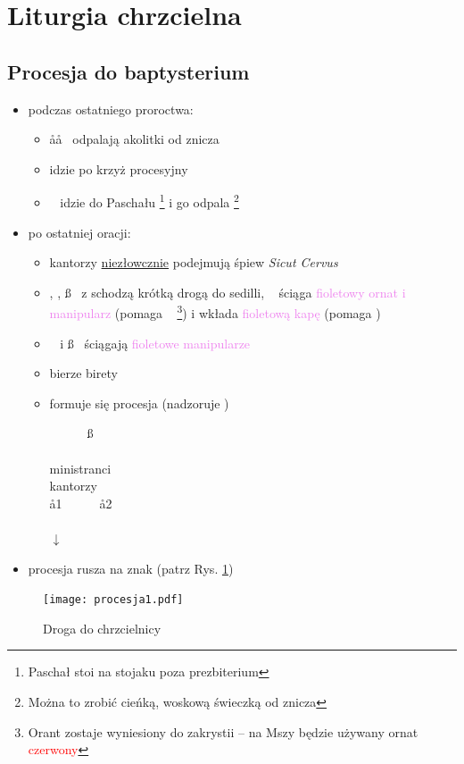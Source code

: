 \section{Liturgia chrzcielna}

\subsection{Procesja do baptysterium}

\begin{itemize}
	\item podczas ostatniego proroctwa:
	      \begin{itemize}
		      \item \aa\aa~ odpalają akolitki od znicza
		      \item {} idzie po krzyż procesyjny
		      \item \paschal~ idzie do Paschału \footnote{Paschał stoi na
			            stojaku poza prezbiterium} i go odpala \footnote{Można
			            to zrobić cieńką, woskową świeczką od znicza}
	      \end{itemize}
	\item po ostatniej oracji:
	      \begin{itemize}
		      \item kantorzy \underline{niezłowcznie}
		            podejmują śpiew \textit{Sicut Cervus}
		      \item \ii, \dd, \ss~ z  schodzą krótką drogą do sedilli,
		            \ii~ ściąga \textcolor{violet}{fioletowy ornat i manipularz}
		            (pomaga \zz~ \footnote{Orant zostaje wyniesiony do zakrystii
			            -- na Mszy będzie używany ornat \textcolor{red}{czerwony}})
		            i wkłada \textcolor{violet}{fioletową kapę} (pomaga )
		      \item \dd~ i \ss~ ściągają \textcolor{violet}{fioletowe manipularze}
		      \item {} bierze birety
		      \item formuje się procesja (nadzoruje )
		            \begin{center}
			            \dd~~~\ii~~~\ss \smallskip\\
			             \\
			            ministranci \smallskip\\
			            kantorzy \smallskip\\
			            \aa1~~~~~~\aa2 \smallskip\\
			            ~~\paschal~~~~~~~ \smallskip\\
			            $\downarrow$
		            \end{center}
	      \end{itemize}
	\item procesja rusza na znak  (patrz Rys. \ref{fig:procesja1})
\end{itemize}
%
\begin{figure}[h]
	\centering
	\texttt{[image: procesja1.pdf]}
	\caption{Droga do chrzcielnicy}
	\label{fig:procesja1}
\end{figure}
%
